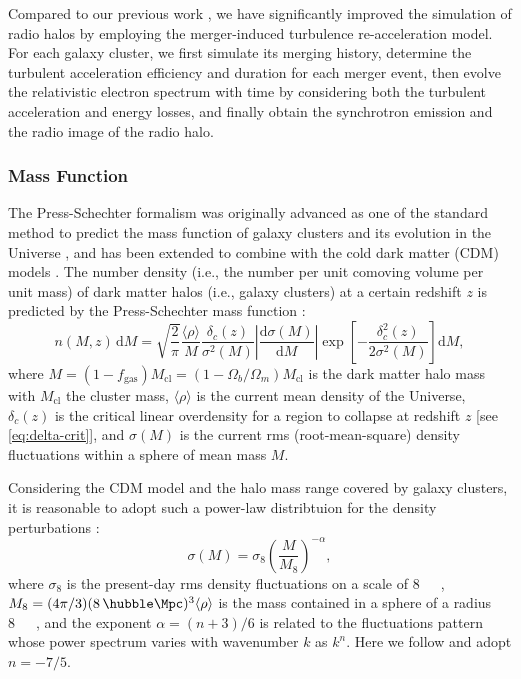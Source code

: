 \documentclass[modern]{aastex61}
\newcommand{\R}[1]{\mathrm{#1}}
\newcommand{\D}[1]{\R{d} #1}
\newcommand{\diff}[2]{\frac{\D{#1}}{\D{#2}}}
\begin{document}
Compared to our previous work \citep{wang2010},
we have significantly improved the simulation of radio halos by
employing the merger-induced turbulence re-acceleration model.
For each galaxy cluster, we first simulate its merging history,
determine the turbulent acceleration efficiency and duration for each
merger event, then evolve the relativistic electron spectrum with time
by considering both the turbulent acceleration and energy losses, and
finally obtain the synchrotron emission and the radio image of the
radio halo.

\subsubsection{Mass Function}
\label{sec:distributions}

The Press-Schechter formalism was originally advanced as one of the standard
method to predict the mass function of galaxy clusters and its evolution
in the Universe \citep{press1974}, and has been extended to combine with
the cold dark matter (CDM) models \citep[e.g.,][]{bond1991,lacey1993}.
The number density (i.e., the number per unit comoving volume per unit
mass) of dark matter halos (i.e., galaxy clusters) at a certain redshift
$z$ is predicted by the Press-Schechter mass function \citep{press1974}:
\begin{equation}
  \label{eq:ps-mass-func}
  n(M, z) \,\D{M} = \sqrt{\frac{2}{\pi}} \frac{\langle{\rho}\rangle}{M}
  \frac{\delta_c(z)}{\sigma^2(M)} \left| \diff{\sigma(M)}{M} \right|
  \exp\!\left[ -\frac{\delta_c^2(z)}{2\sigma^2(M)} \right] \D{M},
\end{equation}
where
$M = (1 - f_{\R{gas}}) M_{\R{cl}} = (1 - \Omega_b/\Omega_m) M_{\R{cl}}$
is the dark matter halo mass with $M_{\R{cl}}$ the cluster mass,
$\langle {\rho} \rangle$ is the current mean density of the Universe,
$\delta_c(z)$ is the critical linear overdensity for a region to collapse
at redshift $z$ [see \autoref{eq:delta-crit}],
and $\sigma(M)$ is the current rms (root-mean-square) density fluctuations
within a sphere of mean mass $M$.

Considering the CDM model and the halo mass range covered by galaxy
clusters, it is reasonable to adopt such a power-law distribtuion
for the density perturbations \citep{sarazin2002,randall2002}:
\begin{equation}
  \label{eq:sigma-mass}
  \sigma(M) = \sigma_8 \left( \frac{M}{M_8} \right)^{-\alpha},
\end{equation}
where $\sigma_8$ is the present-day rms density fluctuations on a
scale of \SI{8}{\per\hubble\Mpc},
$M_8 = (4\pi/3)(8 \,\si{\per\hubble\Mpc})^3 \langle{\rho}\rangle$
is the mass contained in a sphere of a radius \SI{8}{\per\hubble\Mpc},
and the exponent $\alpha = (n+3)/6$ is related to the fluctuations
pattern whose power spectrum varies with wavenumber $k$ as $k^n$.
Here we follow \citet{randall2002} and adopt $n = -7/5$.
\end{document}
